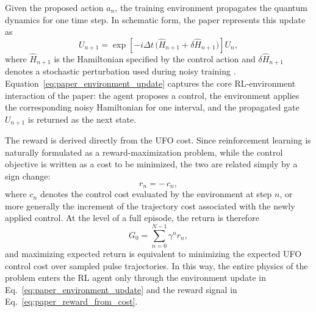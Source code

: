 Given the proposed action \(a_n\), the training environment propagates the quantum dynamics for one time step. In schematic form, the paper represents this update as
\begin{equation}
U_{n+1}
=
\exp\!\left[
-i\Delta t\,
\bigl(
\hat{H}_{n+1}
+
\delta \hat{H}_{n+1}
\bigr)
\right] U_n,
\label{eq:paper_environment_update}
\end{equation}
where \(\hat{H}_{n+1}\) is the Hamiltonian specified by the control action and \(\delta \hat{H}_{n+1}\) denotes a stochastic perturbation used during noisy training \cite{Niu2019}. Equation~\eqref{eq:paper_environment_update} captures the core RL-environment interaction of the paper: the agent proposes a control, the environment applies the corresponding noisy Hamiltonian for one interval, and the propagated gate \(U_{n+1}\) is returned as the next state.

The reward is derived directly from the UFO cost. Since reinforcement learning is naturally formulated as a reward-maximization problem, while the control objective is written as a cost to be minimized, the two are related simply by a sign change:
\begin{equation}
r_n = -\,c_n,
\label{eq:paper_reward_from_cost}
\end{equation}
where \(c_n\) denotes the control cost evaluated by the environment at step \(n\), or more generally the increment of the trajectory cost associated with the newly applied control. At the level of a full episode, the return is therefore
\begin{equation}
G_0
=
\sum_{n=0}^{N-1}\gamma^n r_n,
\label{eq:paper_discounted_return}
\end{equation}
and maximizing expected return is equivalent to minimizing the expected UFO control cost over sampled pulse trajectories. In this way, the entire physics of the problem enters the RL agent only through the environment update in Eq.~\eqref{eq:paper_environment_update} and the reward signal in Eq.~\eqref{eq:paper_reward_from_cost}.

